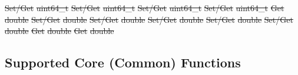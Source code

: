 \documentclass[12pt]{report} %
\providecommand{\DIFdeltex}[1]{{\protect\color{red}\sout{#1}}}                      %
\providecommand{\DIFdelend}{} %
\providecommand{\DIFdel}[1]{\texorpdfstring{\DIFdeltex{#1}}{}} %
\DeclareRobustCommand{\DIFdelend}{\DIFOaddend \let\includegraphics\DIFOincludegraphics} %
\begin{document}
\DIFdel{Set/Get }%
\DIFdel{uint64\_t }%
\DIFdel{Set/Get }%
\DIFdel{uint64\_t }%
\DIFdel{Set/Get }%
\DIFdel{uint64\_t }%
\DIFdel{Set/Get }%
\DIFdel{uint64\_t }%
\DIFdel{Get }%
\DIFdel{double }%
\DIFdel{Set/Get }%
\DIFdel{double }%
\DIFdel{Set/Get }%
\DIFdel{double }%
\DIFdel{Set/Get }%
\DIFdel{double }%
\DIFdel{Set/Get }%
\DIFdel{double }%
\DIFdel{Set/Get }%
\DIFdel{double }%
\DIFdel{Get }%
\DIFdel{double }%
\DIFdel{Get }%
\DIFdel{double }%

\DIFdelend \subsection{Supported Core (Common) Functions}\label{sec:RMMCSupportedCommon}
\end{document}
